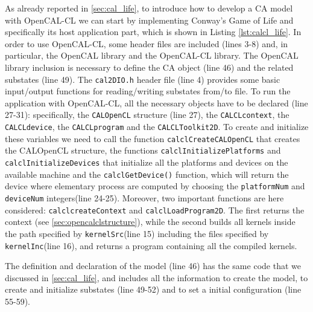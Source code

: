 As already reported in \ref{sec:cal_life}, to introduce how to develop
a CA model with OpenCAL-CL we can start by implementing Conway’s Game
of Life and specifically its host application part, which is shown in
Listing \ref{lst:calcl_life}. In order to use OpenCAL-CL, some header
files are included (lines 3-8) and, in particular, the OpenCAL library
and the OpenCAL-CL library. The OpenCAL library inclusion is necessary
to define the CA object (line 46) and the related substates (line
49). The \verb'cal2DIO.h' header file (line 4) provides some basic
input/output functions for reading/writing substates from/to file. To
run the application with OpenCAL-CL, all the necessary objects have to
be declared (line 27-31): specifically, the \verb'CALOpenCL' structure
(line 27), the \verb'CALCLcontext', the \verb'CALCLdevice', the
\verb'CALCLprogram' and the \verb'CALCLToolkit2D'. To create and
initialize these variables we need to call the function
\verb'calclCreateCALOpenCL' that creates the CALOpenCL structure, the
functions \verb|calclInitializePlatforms| and
\verb|calclInitializeDevices| that initialize all the platforms and
devices on the available machine and the \verb'calclGetDevice()'
function, which will return the device where elementary process are
computed by choosing the \verb'platformNum' and \verb'deviceNum'
integers(line 24-25). Moreover, two important functions are here
considered: \verb'calclcreateContext' and
\verb'calclLoadProgram2D'. The first returns the context
(see \ref{sec:opencalclstructure}), while the second builds all kernels inside
the path specified by \verb'kernelSrc'(line 15) including the files
specified by \verb'kernelInc'(line 16), and returns a program
containing all the compiled kernels.

The definition and declaration of the model (line 46) has the same code
that we discussed in \ref{sec:cal_life}, and includes all the information
to create the model, to create and initialize substates (line 49-52) and 
to set a initial configuration (line 55-59).


	
